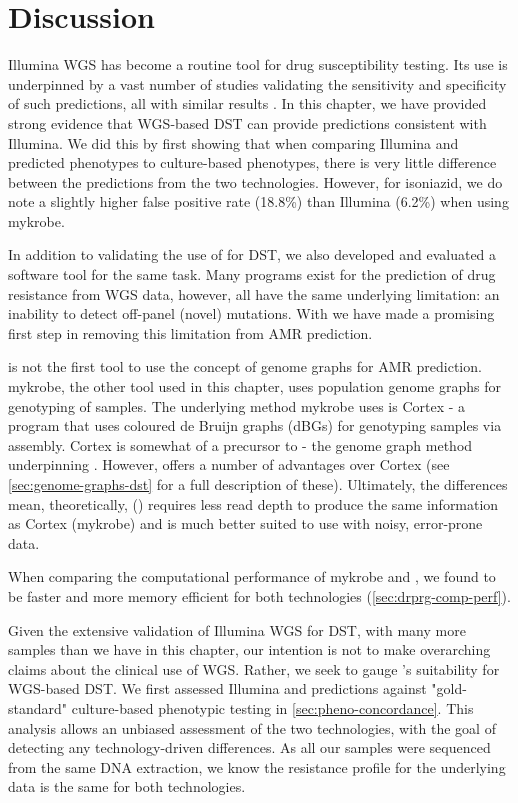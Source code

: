 \section{Discussion}
Illumina WGS has become a routine tool for \mtb{} drug susceptibility testing. Its use is underpinned by a vast number of studies validating the sensitivity and specificity of such predictions, all with similar results \cite{cryptic2018,hunt2019,bradley2015,coll2015,walker2015,kohl2018,phelan2019}. In this chapter, we have provided strong evidence that \ont{} WGS-based DST can provide predictions consistent with Illumina. We did this by first showing that when comparing Illumina and \ont{} predicted phenotypes to culture-based phenotypes, there is very little difference between the predictions from the two technologies. However, for isoniazid, we do note a slightly higher \ont{} false positive rate (18.8\%) than Illumina (6.2\%) when using mykrobe.

In addition to validating the use of \ont{} for DST, we also developed and evaluated a software tool \drprg{} for the same task. Many programs exist for the prediction of drug resistance from WGS data, however, all have the same underlying limitation: an inability to detect off-panel (novel) mutations. With \drprg{} we have made a promising first step in removing this limitation from \mtb{} AMR prediction.

\drprg{} is not the first tool to use the concept of genome graphs for AMR prediction. mykrobe, the other tool used in this chapter, uses population genome graphs for genotyping of samples. The underlying method mykrobe uses is Cortex \cite{iqbal2012} - a program that uses coloured de Bruijn graphs (dBGs) for genotyping samples via \denovo{} assembly. Cortex is somewhat of a precursor to \pandora{} - the genome graph method underpinning \drprg{}. However, \pandora{} offers a number of advantages over Cortex (see \autoref{sec:genome-graphs-dst} for a full description of these). Ultimately, the differences mean, theoretically, \pandora{} (\drprg{}) requires less read depth to produce the same information as Cortex (mykrobe) and is much better suited to use with noisy, error-prone \ont{} data. 

When comparing the computational performance of mykrobe and \drprg{}, we found \drprg{} to be faster and more memory efficient for both technologies (\autoref{sec:drprg-comp-perf}).

\noindent
Given the extensive validation of Illumina WGS for DST, with many more samples than we have in this chapter, our intention is not to make overarching claims about the clinical use of WGS. Rather, we seek to gauge \ont{}'s suitability for WGS-based DST. We first assessed Illumina and \ont{} predictions against "gold-standard" culture-based phenotypic testing in \autoref{sec:pheno-concordance}. This analysis allows an unbiased assessment of the two technologies, with the goal of detecting any technology-driven differences. As all our samples were sequenced from the same DNA extraction, we know the resistance profile for the underlying data is the same for both technologies. 


